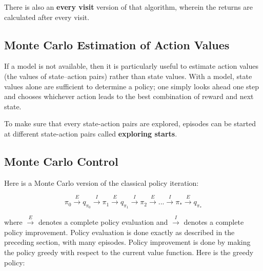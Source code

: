 \documentclass[11pt]{article}
\begin{document}
There is also an \textbf{every visit} version of that algorithm, wherein the returns
are calculated after every visit.

\subsection{Monte Carlo Estimation of Action Values}
\label{sec:org3a3628b}

If a model is not available, then it is particularly useful to estimate action
values (the values of state–action pairs) rather than state values. With a
model, state values alone are sufficient to determine a policy; one simply looks
ahead one step and chooses whichever action leads to the best combination of
reward and next state.

To make sure that every state-action pairs are explored, episodes can be started
at different state-action pairs called \textbf{exploring starts}.

\subsection{Monte Carlo Control}
\label{sec:org6d7ccbe}

Here is a Monte Carlo version of the classical policy iteration:

\begin{equation}
\pi_{0} \xrightarrow{E} q_{\pi_{0}} \xrightarrow{I} \pi_{1} \xrightarrow{E} q_{\pi_{1}} \xrightarrow{I}
\pi_{2} \xrightarrow{E} {...} \xrightarrow{I} \pi_{*} \xrightarrow{E} q_{\pi_{*}}
\end{equation}

where \(\xrightarrow{E}\) denotes a complete policy evaluation and
\(\xrightarrow{I}\) denotes a complete policy improvement. Policy evaluation is
done exactly as described in the preceding section, with many episodes. Policy
improvement is done by making the policy greedy with respect to the current
value function. Here is the greedy policy:
\end{document}
